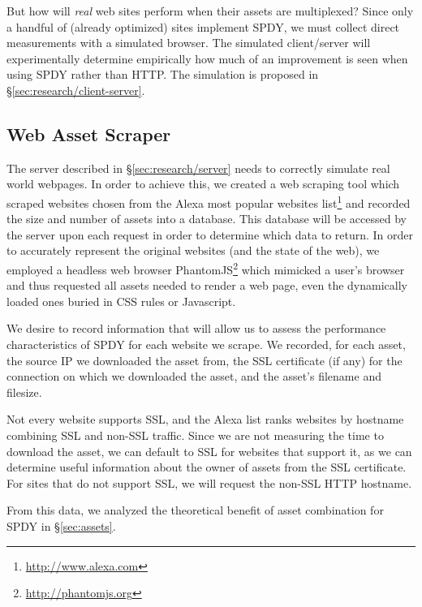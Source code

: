 \documentclass[10pt,letterpaper,notitlepage]{article}
\begin{document}
But how will \textit{real} web sites perform when their assets are multiplexed?
Since only a handful of (already optimized) sites implement SPDY, we must
collect direct measurements with a simulated browser. The simulated
client/server will experimentally determine empirically how much of an
improvement is seen when using SPDY rather than HTTP.  The simulation is
proposed in \S\ref{sec:research/client-server}.

\subsection{Web Asset Scraper}
\label{sec:research/scraper}
The server described in \S\ref{sec:research/server} needs to correctly simulate
real world webpages. In order to achieve this, we created a web scraping tool
which scraped websites chosen from the Alexa most popular websites
list\footnote{\url{http://www.alexa.com}} and recorded the size and number of
assets into a database.  This database will be accessed by the server upon each
request in order to determine which data to return.  In order to accurately
represent the original websites (and the state of the web), we employed a
headless web browser PhantomJS\footnote{\url{http://phantomjs.org}} which
mimicked a user's browser and thus requested all assets needed to render a web
page, even the dynamically loaded ones buried in CSS rules or Javascript.

We desire to record information that will allow us to assess the performance
characteristics of SPDY for each website we scrape. We recorded, for each
asset, the source IP we downloaded the asset from, the SSL certificate (if any)
for the connection on which we downloaded the asset, and the asset's filename
and filesize.

Not every website supports SSL, and the Alexa list ranks websites by hostname
combining SSL and non-SSL traffic. Since we are not measuring the time to
download the asset, we can default to SSL for websites that support it, as we
can determine useful information about the owner of assets from the SSL
certificate. For sites that do not support SSL, we will request the non-SSL
HTTP hostname.

From this data, we analyzed the theoretical benefit of asset combination for
SPDY in \S\ref{sec:assets}.

\end{document}
